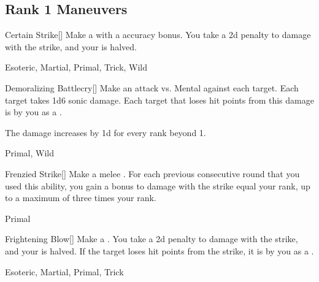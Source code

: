 \subsection{Rank 1 Maneuvers}

\lowercase{\hypertarget{maneuver:Certain Strike}{}}\label{maneuver:Certain Strike}
\hypertarget{maneuver:Certain Strike}{}
\begin{freeability}[Rank 1]{Certain Strike}[]
Make a  with a  accuracy bonus.
You take a \minus2d penalty to damage with the strike, and your  is halved.


 Esoteric, Martial, Primal, Trick, Wild
\end{freeability}
\vspace{0.25em}



\lowercase{\hypertarget{maneuver:Demoralizing Battlecry}{}}\label{maneuver:Demoralizing Battlecry}
\hypertarget{maneuver:Demoralizing Battlecry}{}
\begin{freeability}[Rank 1]{Demoralizing Battlecry}[]
Make an attack vs. Mental against each target.
\hit Each target takes 1d6 sonic damage.
Each target that loses hit points from this damage is  by you as a .

\rankline
The damage increases by \plus1d for every rank beyond 1.


 Primal, Wild
\end{freeability}
\vspace{0.25em}



\lowercase{\hypertarget{maneuver:Frenzied Strike}{}}\label{maneuver:Frenzied Strike}
\hypertarget{maneuver:Frenzied Strike}{}
\begin{freeability}[Rank 1]{Frenzied Strike}[]
Make a melee .
For each previous consecutive round that you used this ability, you gain a bonus to damage with the strike equal your rank, up to a maximum of three times your rank.


 Primal
\end{freeability}
\vspace{0.25em}



\lowercase{\hypertarget{maneuver:Frightening Blow}{}}\label{maneuver:Frightening Blow}
\hypertarget{maneuver:Frightening Blow}{}
\begin{freeability}[Rank 1]{Frightening Blow}[]
Make a .
You take a \minus2d penalty to damage with the strike, and your  is halved.
If the target loses hit points from the strike, it is  by you as a .


 Esoteric, Martial, Primal, Trick
\end{freeability}
\vspace{0.25em}



